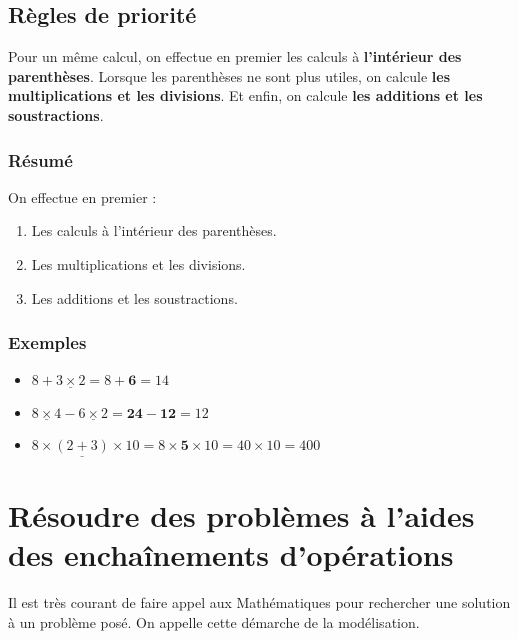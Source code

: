 \documentclass[paper=a4, fontsize=10pt]{scrartcl} %
\begin{document}
\subsection{Règles de priorité}

Pour un même calcul, on effectue en premier les calculs à \textbf{l'intérieur des parenthèses}. Lorsque les parenthèses ne sont plus utiles, on calcule \textbf{les multiplications et les divisions}. Et enfin, on calcule \textbf{les additions et les soustractions}.\\ 

\subsubsection*{Résumé}
On effectue en premier : 
\begin{enumerate}
\item Les calculs à l'intérieur des parenthèses.
\item Les multiplications et les divisions.
\item Les additions et les soustractions.
\end{enumerate}

\subsubsection{Exemples}
\begin{itemize}
\item $8 + \underline{3 \times 2} = 8 + \textbf{6} = 14$
\item $\underline{8 \times 4} - \underline{6 \times 2} = \textbf{24} - \textbf{12} = 12$
\item $8 \times \underline{(2 + 3)} \times 10 = 8 \times \textbf{5} \times 10 = 40 \times 10 = 400$
\end{itemize}
\section{Résoudre des problèmes à l'aides des enchaînements d'opérations}

Il est très courant de faire appel aux Mathématiques pour rechercher une solution à un problème posé. On appelle cette démarche de la modélisation.
\end{document}

